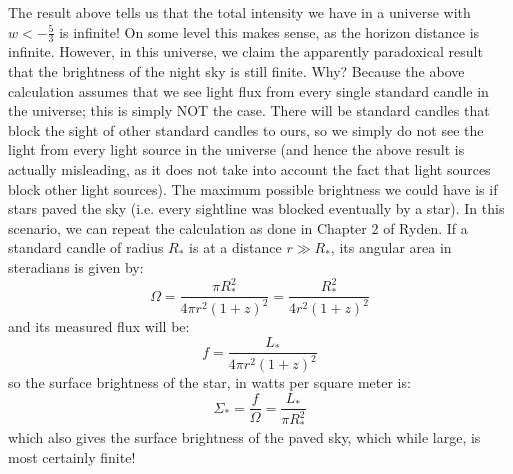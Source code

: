 The result above tells us that the total intensity we have in a universe with $w < -\frac{5}{3}$ is infinite! On some level this makes sense, as the horizon distance is infinite. However, in this universe, we claim the apparently paradoxical result that the brightness of the night sky is still finite. Why? Because the above calculation assumes that we see light flux from every single standard candle in the universe; this is simply NOT the case. There will be standard candles that block the sight of other standard candles to ours, so we simply do not see the light from every light source in the universe (and hence the above result is actually misleading, as it does not take into account the fact that light sources block other light sources). The maximum possible brightness we could have is if stars paved the sky (i.e. every sightline was blocked eventually by a star). In this scenario, we can repeat the calculation as done in Chapter 2 of Ryden. If a standard candle of radius $R_*$ is at a distance $r \gg R_*$, its angular area in steradians is given by:
\begin{equation}
    \Omega = \frac{\pi R_*^2}{4\pi r^2 (1+z)^2} = \frac{R_*^2}{4r^2(1+z)^2}
\end{equation}
and its measured flux will be:
\begin{equation}
    f = \frac{L_*}{4\pi r^2(1+z)^2}
\end{equation}
so the surface brightness of the star, in watts per square meter is:
\begin{equation}
    \Sigma_* = \frac{f}{\Omega} = \frac{L_*}{\pi R_*^2}
\end{equation}
which also gives the surface brightness of the paved sky, which while large, is most certainly finite!

